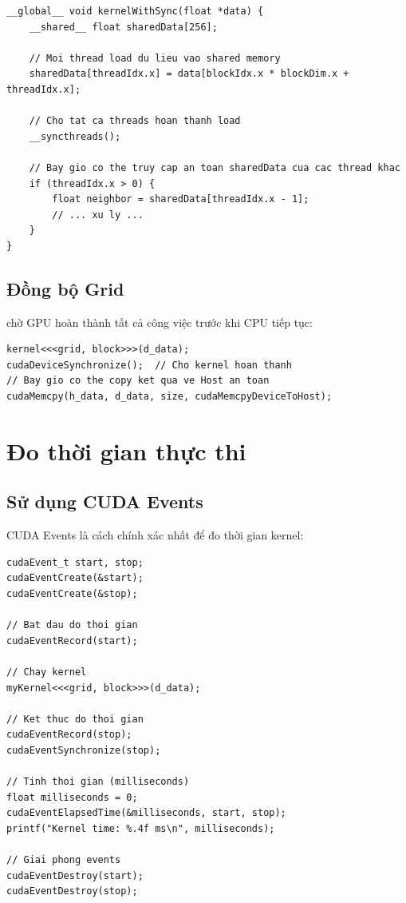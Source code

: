 \begin{lstlisting}[caption={Sử dụng \_\_syncthreads()}, label={lst:syncthreads}]
__global__ void kernelWithSync(float *data) {
    __shared__ float sharedData[256];
    
    // Moi thread load du lieu vao shared memory
    sharedData[threadIdx.x] = data[blockIdx.x * blockDim.x + threadIdx.x];
    
    // Cho tat ca threads hoan thanh load
    __syncthreads();
    
    // Bay gio co the truy cap an toan sharedData cua cac thread khac
    if (threadIdx.x > 0) {
        float neighbor = sharedData[threadIdx.x - 1];
        // ... xu ly ...
    }
}
\end{lstlisting}

\subsection{Đồng bộ Grid}

 chờ GPU hoàn thành tất cả công việc trước khi CPU tiếp tục:

\begin{lstlisting}[caption={Đồng bộ Host-Device}]
kernel<<<grid, block>>>(d_data);
cudaDeviceSynchronize();  // Cho kernel hoan thanh
// Bay gio co the copy ket qua ve Host an toan
cudaMemcpy(h_data, d_data, size, cudaMemcpyDeviceToHost);
\end{lstlisting}

\section{Đo thời gian thực thi}

\subsection{Sử dụng CUDA Events}

CUDA Events là cách chính xác nhất để đo thời gian kernel:

\begin{lstlisting}[caption={Đo thời gian với CUDA Events}, label={lst:cuda_events}]
cudaEvent_t start, stop;
cudaEventCreate(&start);
cudaEventCreate(&stop);

// Bat dau do thoi gian
cudaEventRecord(start);

// Chay kernel
myKernel<<<grid, block>>>(d_data);

// Ket thuc do thoi gian
cudaEventRecord(stop);
cudaEventSynchronize(stop);

// Tinh thoi gian (milliseconds)
float milliseconds = 0;
cudaEventElapsedTime(&milliseconds, start, stop);
printf("Kernel time: %.4f ms\n", milliseconds);

// Giai phong events
cudaEventDestroy(start);
cudaEventDestroy(stop);
\end{lstlisting}

